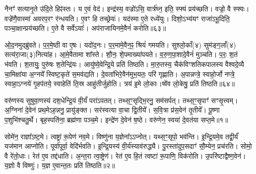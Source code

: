 नैनꣳ॑ सत्यानृ॒ते उ॑दि॒ते हिꣴ॑स्तः।
य ए॒वं वेद॑।
इन्द्र॑स्य॒ वज्रो॑ऽसि॒ वार्त्र॑घ्न॒ इति॒ स्फ्यं प्रय॑च्छति।
वज्रो॒ वै स्फ्यः।
वज्रे॑णै॒वास्मा॑ अवरप॒रꣳ र॑न्धयति।
ए॒वꣳ हि तच्छ्रेयः॑।
यद॑स्मा ए॒ते रध्ये॑युः।
दिशो॒\-ऽभ्य॑यꣳ राजा॑\-ऽभू॒दिति॒ पञ्चा॒क्षान्प्रय॑च्छति।
ए॒ते वै सर्वे\-ऽयाः᳚।
अप॑राजायिनमे॒वैनं॑ करोति॥६३॥\ip

ओ॒द॒नमुद्ब्रु॑वते।
प॒र॒मे॒ष्ठी वा ए॒षः।
यदो॑द॒नः।
प॒र॒मामे॒वैन॒ꣴ॒ श्रियं॑ गमयति।
सुश्लो॒काँ(४) सुम॑ङ्ग॒लाँ(४) सत्य॑रा॒जा(३)\-नित्या॑ह।
आ॒\-मे॒वैतामा शा᳚स्ते।
शौ॒नः॒ शे॒पमाख्या॑पयते।
व॒रु॒ण॒पा॒शादे॒वैनं॑ मुञ्चति।
प॒रः॒ श॒तं भ॑वति।
श॒तायुः॒ पुरु॑षः श॒तेन्द्रि॑यः।
आयु॑ष्ये॒वेन्द्रि॒ये प्रति॑ तिष्ठति।
मा॒रु॒तस्य॒ चैक॑विꣳशतिकपालस्य वैश्वदे॒व्यै चा॒मिक्षा॑या अ॒ग्नये᳚ स्विष्ट॒कृते॑ स॒मव॑द्यति।
दे॒वता॑भिरे॒वैन॑मुभ॒यतः॒ परि॑ गृह्णाति।
अ॒पान्नप्त्रे॒ स्वाहो॒र्जो नप्त्रे॒ स्वाहा॒\-ऽग्नये॑ गृ॒हप॑तये॒ स्वाहेति॑ ति॒स्र आहु॑तीर्जुहोति।
त्रय॑ इ॒मे लो॒काः।ष्वे॑व लो॒केषु॒ प्रति॑ तिष्ठति॥६४॥\ip\anuvakamend[दे॒वैरित्या॑ह स॒त्यस॑वं करोति त्रि॒ष्टुभ॑मे॒वैतेना॑भि॒ व्याह॑रति सत्यानृ॒ते ए॒वाव॑ रुन्धे करोति श॒तेन्द्रि॑यः॒ षट् च॑]


\clearpage
{}
\setcounter{anuvakam}{0}

वरु॑णस्य सुषुवा॒णस्य॑ दश॒धेन्द्रि॒यं वी॒र्यं॑ परा॑\-ऽपतत्।
तथ्स॒ꣳ॒सृद्भि॒रनु॒\- सम॑सर्पत्।
तथ्स॒ꣳ॒सृपाꣳ॑ सꣳसृ॒त्त्वम्।
अ॒ग्निना॑ दे॒वेन॑ प्रथ॒मे\-ऽह॒न्ननु॒ प्रायु॑ङ्क्त।
सर॑स्वत्या वा॒चा द्वि॒तीये᳚।
स॒वि॒त्रा प्र॑स॒वेन॑ तृ॒तीये᳚।
पू॒ष्णा प॒शुभि॑श्चतु॒र्थे।
बृह॒स्पति॑ना॒ ब्रह्म॑णा पञ्च॒मे।
इन्द्रे॑ण दे॒वेन॑ ष॒ष्ठे।
वरु॑णेन॒ स्वया॑ दे॒वत॑या सप्त॒मे॥१॥\ip

सोमे॑न॒ राज्ञा᳚\-ऽष्ट॒मे।
त्वष्ट्रा॑ रू॒पेण॑ नव॒मे।
विष्णु॑ना य॒ज्ञेना᳚\-ऽ\-ऽ\-प्नोत्।
यथ्स॒ꣳ॒सृपो॒ भव॑न्ति।
इ॒न्द्रि॒यमे॒व तद्वी॒र्यं॑ यज॑मान आप्नोति।
पूर्वा॑पूर्वा॒ वेदि॑र्भवति।
इ॒न्द्रि॒यस्य॑ वी॒र्य॑स्या\-व॑\-रुद्ध्यै।
पु॒रस्ता॑\-दुप॒\-सदाꣳ॑ सौ॒म्येन॒ प्रच॑रति।
सोमो॒ वै रे॑तो॒धाः।
रेत॑ ए॒व तद्द॑धाति।
अ॒न्त॒रा त्वा॒ष्ट्रेण॑।
रेत॑ ए॒व हि॒तं त्वष्टा॑ रू॒पाणि॒ विक॑रोति।
उ॒परि॑ष्टाद्वैष्ण॒वेन॑।
य॒ज्ञो वै विष्णुः॑।
य॒ज्ञ ए॒वान्त॒तः प्रति॑ तिष्ठति॥२॥\ip\anuvakamend[स॒प्त॒मे द॑धाति॒ पञ्च॑ च]

